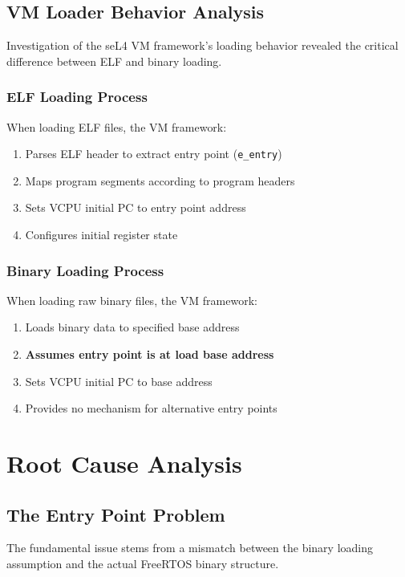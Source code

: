 \documentclass[11pt,a4paper]{article}
\begin{document}
\subsection{VM Loader Behavior Analysis}

Investigation of the seL4 VM framework's loading behavior revealed the critical difference between ELF and binary loading.

\subsubsection{ELF Loading Process}

When loading ELF files, the VM framework:
\begin{enumerate}
\item Parses ELF header to extract entry point (\texttt{e\_entry})
\item Maps program segments according to program headers
\item Sets VCPU initial PC to entry point address
\item Configures initial register state
\end{enumerate}

\subsubsection{Binary Loading Process}

When loading raw binary files, the VM framework:
\begin{enumerate}
\item Loads binary data to specified base address
\item \textbf{Assumes entry point is at load base address}
\item Sets VCPU initial PC to base address
\item Provides no mechanism for alternative entry points
\end{enumerate}

\section{Root Cause Analysis}

\subsection{The Entry Point Problem}

The fundamental issue stems from a mismatch between the binary loading assumption and the actual FreeRTOS binary structure.
\end{document}
